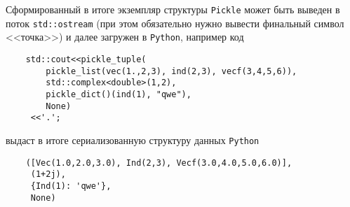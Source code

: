 Сформированный в итоге экземпляр структуры \verb'Pickle' может быть выведен в поток \verb'std::ostream' (при этом обязательно нужно вывести финальный символ <<точка>>)
и далее загружен в \verb'Python', например код
\begin{verbatim}
    std::cout<<pickle_tuple(
        pickle_list(vec(1.,2,3), ind(2,3), vecf(3,4,5,6)), 
        std::complex<double>(1,2), 
        pickle_dict()(ind(1), "qwe"), 
        None)
     <<'.';
\end{verbatim}
выдаст в итоге сериализованную структуру данных \verb'Python'
\begin{verbatim}
    ([Vec(1.0,2.0,3.0), Ind(2,3), Vecf(3.0,4.0,5.0,6.0)], 
     (1+2j), 
     {Ind(1): 'qwe'}, 
     None)
\end{verbatim}


